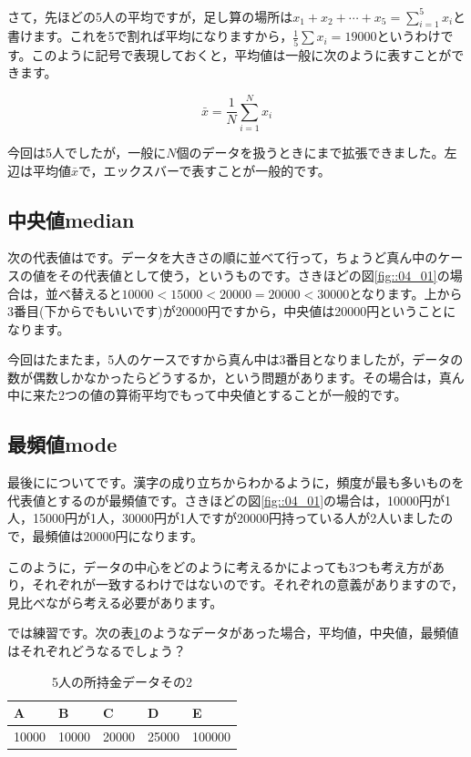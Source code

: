 \documentclass{ltjbook}
\begin{document}
さて，先ほどの5人の平均ですが，足し算の場所は$x_1+x_2+\cdots+x_5=\sum_{i=1}^5 x_i$と書けます。これを5で割れば平均になりますから，$\frac{1}{5}\sum x_i = 19000$というわけです。このように記号で表現しておくと，平均値は一般に次のように表すことができます。

\[ \bar{x} = \frac{1}{N}\sum_{i=1}^N x_i \]

今回は5人でしたが，一般に$N$個のデータを扱うときにまで拡張できました。左辺は平均値$\bar{x}$で，エックスバーで表すことが一般的です。
\subsection{中央値median}
次の代表値はです。データを大きさの順に並べて行って，ちょうど真ん中のケースの値をその代表値として使う，というものです。さきほどの図\ref{fig::04_01}の場合は，並べ替えると$10000<15000<20000=20000<30000$となります。上から3番目(下からでもいいです)が20000円ですから，中央値は20000円ということになります。

今回はたまたま，5人のケースですから真ん中は3番目となりましたが，データの数が偶数しかなかったらどうするか，という問題があります。その場合は，真ん中に来た2つの値の算術平均でもって中央値とすることが一般的です。

\subsection{最頻値mode}
最後にについてです。漢字の成り立ちからわかるように，頻度が最も多いものを代表値とするのが最頻値です。さきほどの図\ref{fig::04_01}の場合は，10000円が1人，15000円が1人，30000円が1人ですが20000円持っている人が2人いましたので，最頻値は20000円になります。

このように，データの中心をどのように考えるかによっても3つも考え方があり，それぞれが一致するわけではないのです。それぞれの意義がありますので，見比べながら考える必要があります。

では練習です。次の表\ref{tbl::04_01}のようなデータがあった場合，平均値，中央値，最頻値はそれぞれどうなるでしょう？

\begin{table}[ht]
	\centering
	\caption{5人の所持金データその2}
	\begin{tabular}{lllll}
		A     & B     & C     & D     & E      \\\hline
		10000 & 10000 & 20000 & 25000 & 100000 \\
	\end{tabular}
	\label{tbl::04_01}
\end{table}
\end{document}
